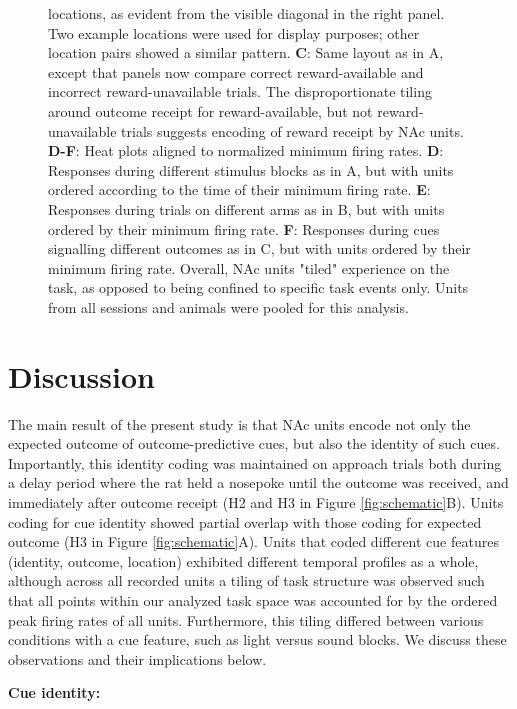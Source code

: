\documentclass[11pt]{article}
\newcommand{\bsf}[1]{\textbf{#1}}
\begin{document}
\begin{figure}[ht!]
{locations, as evident from the visible diagonal in the right panel. Two
example locations were used for display purposes; other location pairs showed
a similar pattern. \bsf{C}: Same layout as in A, except that panels now compare
correct reward-available and incorrect reward-unavailable trials. The disproportionate tiling around outcome receipt for reward-available, but not reward-unavailable
trials suggests encoding of reward receipt by NAc units. \bsf{D-F}: Heat plots aligned to normalized minimum firing rates. \bsf{D}: Responses during different stimulus blocks as in A, but with units ordered according to
the time of their minimum firing rate. \bsf{E}: Responses during trials on different arms as in B, but with units ordered by their minimum
firing rate. \bsf{F}: Responses during cues signalling different outcomes as in C, but with units ordered by their minimum firing
rate. Overall, NAc units "tiled" experience on the task, as opposed to being
confined to specific task events only. Units from all sessions and animals
were pooled for this analysis.}
\label{fig:NP_tiling}
\end{figure} \clearpage

\section*{Discussion}

The main result of the present study is that NAc units encode not
only the expected outcome of outcome-predictive cues, but also the
identity of such cues. Importantly, this identity coding was
maintained on approach trials both during a delay period where the rat held
a nosepoke until the outcome was received, and immediately after outcome receipt (H2 and H3 in Figure
\ref{fig:schematic}B). Units coding for cue identity showed partial
overlap with those coding for expected outcome (H3 in Figure
\ref{fig:schematic}A). Units that coded different cue features
(identity, outcome, location) exhibited different temporal profiles as
a whole, although across all recorded units a tiling of task structure
was observed such that all points within our analyzed task space was
accounted for by the ordered peak firing rates of all
units. Furthermore, this tiling differed between various conditions
with a cue feature, such as light versus sound blocks. We discuss
these observations and their implications below.

{\bf Cue identity:}
\end{document}
